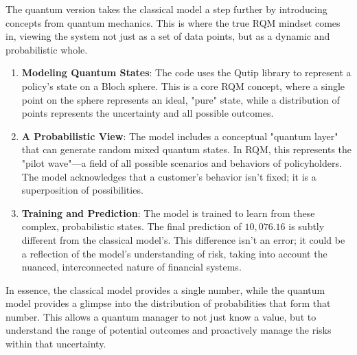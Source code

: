 \documentclass{article}
\begin{document}
The quantum version takes the classical model a step further by introducing concepts from quantum mechanics. This is where the true RQM mindset comes in, viewing the system not just as a set of data points, but as a dynamic and probabilistic whole.
\begin{enumerate}
\item \textbf{Modeling Quantum States}: The code uses the Qutip library to represent a policy's state on a Bloch sphere. This is a core RQM concept, where a single point on the sphere represents an ideal, "pure" state, while a distribution of points represents the uncertainty and all possible outcomes.
\item \textbf{A Probabilistic View}: The model includes a conceptual "quantum layer" that can generate random mixed quantum states. In RQM, this represents the "pilot wave"---a field of all possible scenarios and behaviors of policyholders. The model acknowledges that a customer's behavior isn't fixed; it is a superposition of possibilities.
\item \textbf{Training and Prediction}: The model is trained to learn from these complex, probabilistic states. The final prediction of $10,076.16$ is subtly different from the classical model's. This difference isn't an error; it could be a reflection of the model's understanding of risk, taking into account the nuanced, interconnected nature of financial systems.
\end{enumerate}
In essence, the classical model provides a single number, while the quantum model provides a glimpse into the distribution of probabilities that form that number. This allows a quantum manager to not just know a value, but to understand the range of potential outcomes and proactively manage the risks within that uncertainty.
\end{document}
